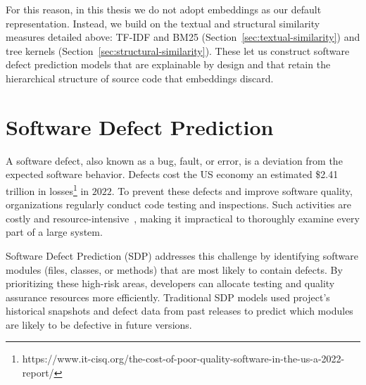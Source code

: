 \documentclass[\main/thesis.tex]{subfiles}
\begin{document}
For this reason, in this thesis we do not adopt embeddings as our default representation. Instead, we build on the textual and structural similarity measures detailed above: TF-IDF and BM25 (Section~\ref{sec:textual-similarity}) and tree kernels (Section~\ref{sec:structural-similarity}). These let us construct software defect prediction models that are explainable by design and that retain the hierarchical structure of source code that embeddings discard.


\section{Software Defect Prediction}
A software defect, also known as a bug, fault, or error, is a deviation from the expected software behavior. Defects cost the US economy an estimated \$2.41 trillion in losses\footnote{https://www.it-cisq.org/the-cost-of-poor-quality-software-in-the-us-a-2022-report/} in $2022$. To prevent these defects and improve software quality, organizations regularly conduct code testing and inspections. Such activities are costly and resource-intensive~\cite{thongtanunam2015investigating}, making it impractical to thoroughly examine every part of a large system. 

Software Defect Prediction (SDP) addresses this challenge by identifying software modules (files, classes, or methods) that are most likely to contain defects. By prioritizing these high-risk areas, developers can allocate testing and quality assurance resources more efficiently. Traditional SDP models used project's historical snapshots and defect data from past releases to predict which modules are likely to be defective in future versions. 
\end{document}
